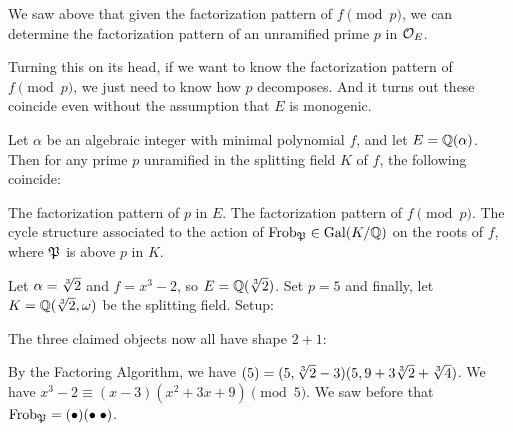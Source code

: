 We saw above that given the factorization pattern of $f \pmod p$, we can determine the factorization pattern of an unramified prime $p$ in $\mathcal O_E$.

Turning this on its head, if we want to know the factorization pattern of $f \pmod p$,
we just need to know how $p$ decomposes.
And it turns out these coincide even without the assumption that $E$ is monogenic.

\begin{theorem}
	\label{thm:factor_poly_frob}
	Let $\alpha$ be an algebraic integer with minimal polynomial $f$,
	and let $E = \mathbb Q(\alpha)$.
	Then for any prime $p$ unramified in the splitting field $K$ of $f$,
	the following coincide:
	\begin{enumerate}[(i)]
		\ii The factorization pattern of $p$ in $E$.
		\ii The factorization pattern of $f \pmod p$.
		\ii The cycle structure associated to the action
		of $\mathrm{Frob}_{\mathfrak P} \in \operatorname{Gal}(K/\mathbb Q)$ on the roots of $f$,
		where $\mathfrak P$ is above $p$ in $K$.
	\end{enumerate}
\end{theorem}
\begin{example}
	Let $\alpha = \sqrt[3]{2}$ and $f = x^3-2$, so $E = \mathbb Q(\sqrt[3]{2})$.
	Set $p=5$ and finally, let $K = \mathbb Q(\sqrt[3]{2}, \omega)$ be the splitting field.
	Setup:
	\begin{center}
	\end{center}
	The three claimed objects now all have shape $2+1$:
	\begin{enumerate}[(i)]
		\ii By the Factoring Algorithm, we have
		$(5) = (5, \sqrt[3]{2}-3)(5, 9+3\sqrt[3]{2}+\sqrt[3]{4})$.
		\ii We have $x^3-2 \equiv (x-3)(x^2+3x+9) \pmod 5$.
		\ii We saw before that $\mathrm{Frob}_{\mathfrak P} = (\bullet)(\bullet \; \bullet)$.
	\end{enumerate}
\end{example}

